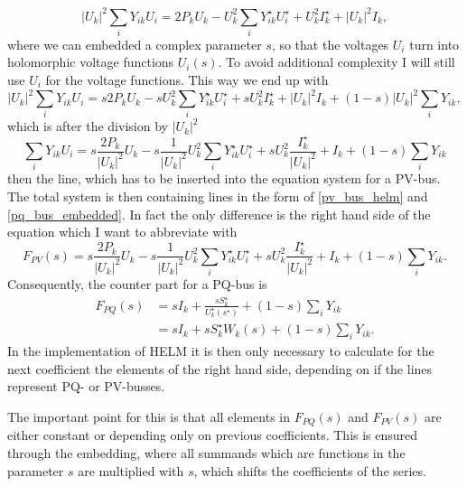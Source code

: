 \begin{equation}
	|U_k|^2 \sum_i Y_{ik} U_i = 2 P_k U_k - U_k^2 \sum_i Y_{ik}^\star U_i^\star + U_k^2 I_k^\star + |U_k|^2 I_k,
\end{equation}
where we can embedded a complex parameter $s$, so that the voltages $U_i$ turn into holomorphic voltage functions $U_i(s)$. To avoid additional complexity I will still use $U_i$ for the voltage functions. This way we end up with
\begin{equation}
	|U_k|^2 \sum_i Y_{ik} U_i = s 2 P_k U_k - s U_k^2 \sum_i Y_{ik}^\star U_i^\star + s U_k^2 I_k^\star + |U_k|^2 I_k + (1 - s) |U_k|^2 \sum_i Y_{ik},
\end{equation}
which is after the division by $|U_k|^2$
\begin{equation}
	\sum_i Y_{ik} U_i = s \frac{2 P_k}{|U_k|^2} U_k - s \frac{1}{|U_k|^2} U_k^2 \sum_i Y_{ik}^\star U_i^\star + s U_k^2 \frac{I_k^\star}{|U_k|^2} + I_k + (1 - s) \sum_i Y_{ik}
	\label{eq:pv_bus_helm}
\end{equation}
then the line, which has to be inserted into the equation system for a PV-bus. The total system is then containing lines in the form of \eqref{pv_bus_helm} and \eqref{pq_bus_embedded}. In fact the only difference is the right hand side of the equation which I want to abbreviate with
\begin{equation}
	F_{PV}(s) = s \frac{2 P_k}{|U_k|^2} U_k - s \frac{1}{|U_k|^2} U_k^2 \sum_i Y_{ik}^\star U_i^\star + s U_k^2 \frac{I_k^\star}{|U_k|^2} + I_k + (1 - s) \sum_i Y_{ik}.
	\label{eq:rhs_pv}
\end{equation}
Consequently, the counter part for a PQ-bus is
\begin{align}
	F_{PQ}(s) 	& = s I_k + \frac{s S_k^\star}{U_k^\star(s^\star)} + (1 - s) \sum_i Y_{ik} \\
				& = s I_k + s S_k^\star W_k(s) + (1 - s) \sum_i Y_{ik}.
	\label{eq:rhs_pq}
\end{align}
In the implementation of HELM it is then only necessary to calculate for the next coefficient the elements of the right hand side, depending on if the lines represent PQ- or PV-busses.

The important point for this is that all elements in $F_{PQ}(s)$ and $F_{PV}(s)$ are either constant or depending only on previous coefficients. This is ensured through the embedding, where all summands which are functions in the parameter $s$ are multiplied with $s$, which shifts the coefficients of the series.

